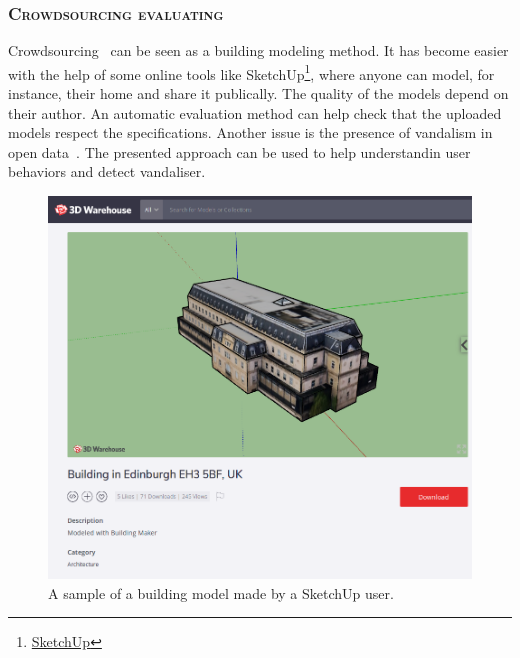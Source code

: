             \subsubsection{\textsc{Crowdsourcing evaluating}}
            Crowdsourcing~\parencite{kovashka2016crowdsourcing} can be seen as a building modeling method.
            It has become easier with the help of some online tools like SketchUp\footnote{
                \href{https://www.sketchup.com}{SketchUp}
            }, where anyone can model, for instance, their home and share it publically.
            The quality of the models depend on their author.
            An automatic evaluation method can help check that the uploaded models respect the specifications.
            Another issue is the presence of vandalism in open data~\parencite{neis2012towards}.
            The presented approach can be used to help understandin user behaviors and detect vandaliser.
            \begin{figure}[htpb]
                \centering
                \includegraphics[width=.7\textwidth]{images/introduction/use/crowdsourcing}
                \caption{\label{fig::crowdsourcing} A sample of a building model made by a SketchUp user.}
            \end{figure}


